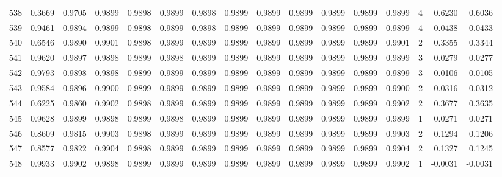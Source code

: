 \begin{tabular}{lrrrrrrrrrrrrrrr}
538 &      0.3669 &  0.9705 &  0.9899 &  0.9898 &  0.9899 &  0.9898 &  0.9899 &  0.9899 &  0.9899 &  0.9899 &   0.9899 &     0.9899 &      4 &                    0.6230 &                     0.6036 \\
539 &      0.9461 &  0.9894 &  0.9899 &  0.9898 &  0.9899 &  0.9898 &  0.9899 &  0.9899 &  0.9899 &  0.9899 &   0.9899 &     0.9899 &      4 &                    0.0438 &                     0.0433 \\
540 &      0.6546 &  0.9890 &  0.9901 &  0.9898 &  0.9899 &  0.9899 &  0.9899 &  0.9899 &  0.9899 &  0.9899 &   0.9899 &     0.9901 &      2 &                    0.3355 &                     0.3344 \\
541 &      0.9620 &  0.9897 &  0.9898 &  0.9899 &  0.9898 &  0.9899 &  0.9899 &  0.9899 &  0.9899 &  0.9899 &   0.9899 &     0.9899 &      3 &                    0.0279 &                     0.0277 \\
542 &      0.9793 &  0.9898 &  0.9898 &  0.9899 &  0.9899 &  0.9899 &  0.9899 &  0.9899 &  0.9899 &  0.9899 &   0.9899 &     0.9899 &      3 &                    0.0106 &                     0.0105 \\
543 &      0.9584 &  0.9896 &  0.9900 &  0.9899 &  0.9899 &  0.9899 &  0.9899 &  0.9899 &  0.9899 &  0.9899 &   0.9899 &     0.9900 &      2 &                    0.0316 &                     0.0312 \\
544 &      0.6225 &  0.9860 &  0.9902 &  0.9898 &  0.9899 &  0.9899 &  0.9899 &  0.9899 &  0.9899 &  0.9899 &   0.9899 &     0.9902 &      2 &                    0.3677 &                     0.3635 \\
545 &      0.9628 &  0.9899 &  0.9898 &  0.9899 &  0.9898 &  0.9899 &  0.9899 &  0.9899 &  0.9899 &  0.9899 &   0.9899 &     0.9899 &      1 &                    0.0271 &                     0.0271 \\
546 &      0.8609 &  0.9815 &  0.9903 &  0.9898 &  0.9899 &  0.9899 &  0.9899 &  0.9899 &  0.9899 &  0.9899 &   0.9899 &     0.9903 &      2 &                    0.1294 &                     0.1206 \\
547 &      0.8577 &  0.9822 &  0.9904 &  0.9898 &  0.9899 &  0.9899 &  0.9899 &  0.9899 &  0.9899 &  0.9899 &   0.9899 &     0.9904 &      2 &                    0.1327 &                     0.1245 \\
548 &      0.9933 &  0.9902 &  0.9898 &  0.9899 &  0.9899 &  0.9899 &  0.9899 &  0.9899 &  0.9899 &  0.9899 &   0.9899 &     0.9902 &      1 &                   -0.0031 &                    -0.0031 \\

\end{tabular}
